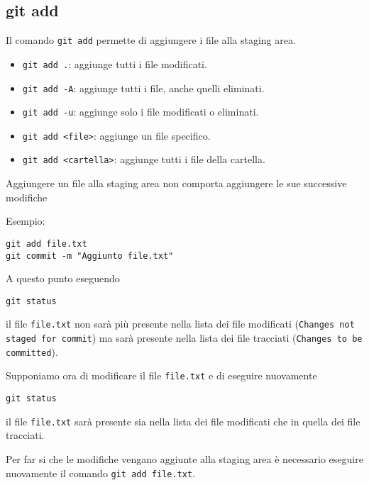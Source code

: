 \documentclass{article}
\begin{document}
\subsection{git add}
Il comando \texttt{git add} permette di aggiungere i file alla staging area.
\begin{itemize}
    \item \texttt{git add .}: aggiunge tutti i file modificati.
    \item \texttt{git add -A}: aggiunge tutti i file, anche quelli eliminati.
    \item \texttt{git add -u}: aggiunge solo i file modificati o eliminati.
    \item \texttt{git add <file>}: aggiunge un file specifico.
    \item \texttt{git add <cartella>}: aggiunge tutti i file della cartella.
\end{itemize}

\begin{highlight}
    Aggiungere un file alla staging area non comporta aggiungere le sue 
    successive modifiche
\end{highlight}

Esempio:
\begin{verbatim}
git add file.txt
git commit -m "Aggiunto file.txt"
\end{verbatim}    

A questo punto eseguendo
\begin{verbatim}
git status
\end{verbatim}
il file \texttt{file.txt} non sarà più presente nella lista dei file modificati 
(\texttt{Changes not staged for commit}) ma sarà presente nella lista dei file tracciati (\texttt{Changes to be committed}).

Supponiamo ora di modificare il file \texttt{file.txt} e di eseguire nuovamente
\begin{verbatim}
git status
\end{verbatim}
il file \texttt{file.txt} sarà presente sia nella lista dei file modificati 
 che in quella dei file tracciati.

Per far si che le modifiche vengano aggiunte alla staging area è necessario
eseguire nuovamente il comando \texttt{git add file.txt}.
\end{document}
